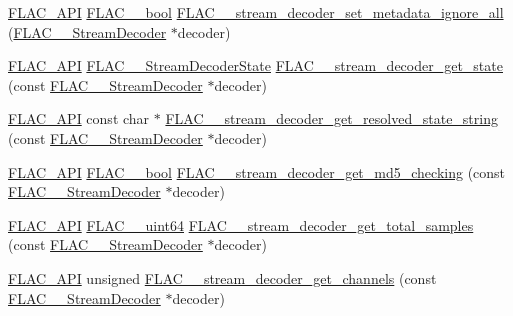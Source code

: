 \begin{DoxyCompactItemize}
\item 
\mbox{\hyperlink{group__flac__export_ga56ca07df8a23310707732b1c0007d6f5}{F\+L\+A\+C\+\_\+\+A\+PI}} \mbox{\hyperlink{ordinals_8h_a95103469f1cbd78b8cf250194985b34e}{F\+L\+A\+C\+\_\+\+\_\+bool}} \mbox{\hyperlink{group__flac__stream__decoder_ga6e515420f5b2a5422cd333b3d4c21064}{F\+L\+A\+C\+\_\+\+\_\+stream\+\_\+decoder\+\_\+set\+\_\+metadata\+\_\+ignore\+\_\+all}} (\mbox{\hyperlink{struct_f_l_a_c_____stream_decoder}{F\+L\+A\+C\+\_\+\+\_\+\+Stream\+Decoder}} $\ast$decoder)
\item 
\mbox{\hyperlink{group__flac__export_ga56ca07df8a23310707732b1c0007d6f5}{F\+L\+A\+C\+\_\+\+A\+PI}} \mbox{\hyperlink{group__flac__stream__decoder_ga3adb6891c5871a87cd5bbae6c770ba2d}{F\+L\+A\+C\+\_\+\+\_\+\+Stream\+Decoder\+State}} \mbox{\hyperlink{group__flac__stream__decoder_ga5899c204ad7183ec04e41855090c0635}{F\+L\+A\+C\+\_\+\+\_\+stream\+\_\+decoder\+\_\+get\+\_\+state}} (const \mbox{\hyperlink{struct_f_l_a_c_____stream_decoder}{F\+L\+A\+C\+\_\+\+\_\+\+Stream\+Decoder}} $\ast$decoder)
\item 
\mbox{\hyperlink{group__flac__export_ga56ca07df8a23310707732b1c0007d6f5}{F\+L\+A\+C\+\_\+\+A\+PI}} const char $\ast$ \mbox{\hyperlink{group__flac__stream__decoder_ga0f086d3e2114f378b06e585ab6f4ff6b}{F\+L\+A\+C\+\_\+\+\_\+stream\+\_\+decoder\+\_\+get\+\_\+resolved\+\_\+state\+\_\+string}} (const \mbox{\hyperlink{struct_f_l_a_c_____stream_decoder}{F\+L\+A\+C\+\_\+\+\_\+\+Stream\+Decoder}} $\ast$decoder)
\item 
\mbox{\hyperlink{group__flac__export_ga56ca07df8a23310707732b1c0007d6f5}{F\+L\+A\+C\+\_\+\+A\+PI}} \mbox{\hyperlink{ordinals_8h_a95103469f1cbd78b8cf250194985b34e}{F\+L\+A\+C\+\_\+\+\_\+bool}} \mbox{\hyperlink{group__flac__stream__decoder_ga3b19d2a761ea61cc57b12e31a5c1adf6}{F\+L\+A\+C\+\_\+\+\_\+stream\+\_\+decoder\+\_\+get\+\_\+md5\+\_\+checking}} (const \mbox{\hyperlink{struct_f_l_a_c_____stream_decoder}{F\+L\+A\+C\+\_\+\+\_\+\+Stream\+Decoder}} $\ast$decoder)
\item 
\mbox{\hyperlink{group__flac__export_ga56ca07df8a23310707732b1c0007d6f5}{F\+L\+A\+C\+\_\+\+A\+PI}} \mbox{\hyperlink{ordinals_8h_aa78c8c70a3eb8a58af7436f278acde8e}{F\+L\+A\+C\+\_\+\+\_\+uint64}} \mbox{\hyperlink{group__flac__stream__decoder_ga68a80ea677bf4abb535abd8f28f2183c}{F\+L\+A\+C\+\_\+\+\_\+stream\+\_\+decoder\+\_\+get\+\_\+total\+\_\+samples}} (const \mbox{\hyperlink{struct_f_l_a_c_____stream_decoder}{F\+L\+A\+C\+\_\+\+\_\+\+Stream\+Decoder}} $\ast$decoder)
\item 
\mbox{\hyperlink{group__flac__export_ga56ca07df8a23310707732b1c0007d6f5}{F\+L\+A\+C\+\_\+\+A\+PI}} unsigned \mbox{\hyperlink{group__flac__stream__decoder_ga42b7d224faeee633e6359ac1f921f39a}{F\+L\+A\+C\+\_\+\+\_\+stream\+\_\+decoder\+\_\+get\+\_\+channels}} (const \mbox{\hyperlink{struct_f_l_a_c_____stream_decoder}{F\+L\+A\+C\+\_\+\+\_\+\+Stream\+Decoder}} $\ast$decoder)

\end{DoxyCompactItemize}
